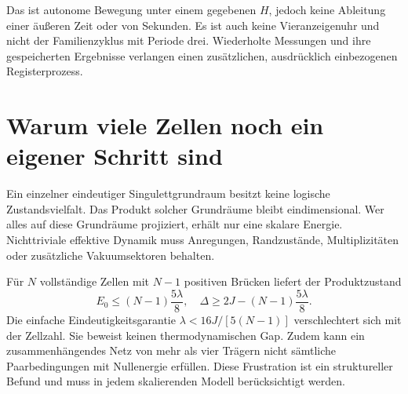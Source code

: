 Das ist autonome Bewegung unter einem gegebenen $H$, jedoch keine Ableitung einer äußeren Zeit oder von Sekunden. Es ist auch keine Vieranzeigenuhr und nicht der Familienzyklus mit Periode drei. Wiederholte Messungen und ihre gespeicherten Ergebnisse verlangen einen zusätzlichen, ausdrücklich einbezogenen Registerprozess.

\section{Warum viele Zellen noch ein eigener Schritt sind}
Ein einzelner eindeutiger Singulettgrundraum besitzt keine logische Zustandsvielfalt. Das Produkt solcher Grundräume bleibt eindimensional. Wer alles auf diese Grundräume projiziert, erhält nur eine skalare Energie. Nichttriviale effektive Dynamik muss Anregungen, Randzustände, Multiplizitäten oder zusätzliche Vakuumsektoren behalten.

Für $N$ vollständige Zellen mit $N-1$ positiven Brücken liefert der Produktzustand
\begin{equation}
E_0\le(N-1)\frac{5\lambda}{8},\quad
\Delta\ge2J-(N-1)\frac{5\lambda}{8}.
\end{equation}
Die einfache Eindeutigkeitsgarantie $\lambda<16J/[5(N-1)]$ verschlechtert sich mit der Zellzahl. Sie beweist keinen thermodynamischen Gap. Zudem kann ein zusammenhängendes Netz von mehr als vier Trägern nicht sämtliche Paarbedingungen mit Nullenergie erfüllen. Diese Frustration ist ein struktureller Befund und muss in jedem skalierenden Modell berücksichtigt werden.
